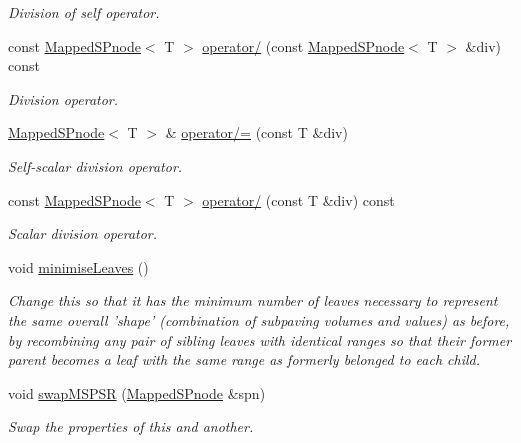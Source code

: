\begin{DoxyCompactItemize}
\begin{DoxyCompactList}\small\item\em \-Division of self operator. \end{DoxyCompactList}\item 
const \hyperlink{classsubpavings_1_1MappedSPnode}{\-Mapped\-S\-Pnode}$<$ \-T $>$ \hyperlink{classsubpavings_1_1MappedSPnode_a7a92e3c463e2fbe951824badf0aa2383}{operator/} (const \hyperlink{classsubpavings_1_1MappedSPnode}{\-Mapped\-S\-Pnode}$<$ \-T $>$ \&div) const 
\begin{DoxyCompactList}\small\item\em \-Division operator. \end{DoxyCompactList}\item 
\hyperlink{classsubpavings_1_1MappedSPnode}{\-Mapped\-S\-Pnode}$<$ \-T $>$ \& \hyperlink{classsubpavings_1_1MappedSPnode_aab106627889397cf17d3ea7a3626e363}{operator/=} (const \-T \&div)
\begin{DoxyCompactList}\small\item\em \-Self-\/scalar division operator. \end{DoxyCompactList}\item 
const \hyperlink{classsubpavings_1_1MappedSPnode}{\-Mapped\-S\-Pnode}$<$ \-T $>$ \hyperlink{classsubpavings_1_1MappedSPnode_ad8deddac45220ce11ba734c5ff4694d0}{operator/} (const \-T \&div) const 
\begin{DoxyCompactList}\small\item\em \-Scalar division operator. \end{DoxyCompactList}\item 
void \hyperlink{classsubpavings_1_1MappedSPnode_aceaf989b21707aa1f00a9d8372cf2551}{minimise\-Leaves} ()
\begin{DoxyCompactList}\small\item\em \-Change this so that it has the minimum number of leaves necessary to represent the same overall 'shape' (combination of subpaving volumes and values) as before, by recombining any pair of sibling leaves with identical ranges so that their former parent becomes a leaf with the same range as formerly belonged to each child. \end{DoxyCompactList}\item 
void \hyperlink{classsubpavings_1_1MappedSPnode_a4375171ab30bfe88e4a3306f321d3e24}{swap\-M\-S\-P\-S\-R} (\hyperlink{classsubpavings_1_1MappedSPnode}{\-Mapped\-S\-Pnode} \&spn)
\begin{DoxyCompactList}\small\item\em \-Swap the properties of this and another. \end{DoxyCompactList}\item 

\end{DoxyCompactItemize}
